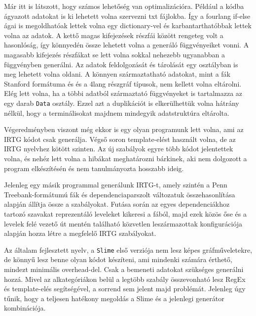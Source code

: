 Már itt is látszott, hogy számos lehetőség van optimalizációra. 
Például a kódba ágyazott adatokat is ki lehetett volna szervezni txt fájlokba. 
Így a fourlang if-else ágai is megoldhatóak lettek volna egy dictionary-vel és karbantarthatóbbak lettek volna az adatok. 
A kettő magas kifejezések részfái között rengeteg volt a hasonlóság, így könnyedén össze lehetett volna a generáló függvényeiket vonni. 
A magasabb kifejezés részfákat se lett volna sokkal nehezebb ugyanabban a függvényben generálni. 
Az adatok feldolgozását és tárolását egy osztályban is meg lehetett volna oldani. 
A könnyen származtatható adatokat, mint a fák Stanford formátuma és és a 4lang részgráf típusok, nem kellett volna eltárolni. 
Elég lett volna, ha a többi adatból származtató függvényeket is tartalmazza az egy darab \texttt{Data} osztály. 
Ezzel azt a duplikációt is elkerülhettük volna hátrány nélkül, hogy a terminálisokat majdnem mindegyik adatstruktúra eltárolta.

Végeredményben viszont még ekkor is egy olyan programunk lett volna, ami az IRTG kódot csak generálja. 
Végső soron template-elést használt volna, de az IRTG nyelvhez kötött szinten. 
Az új szabályok egyre több kódot jelentettek volna, és nehéz lett volna a hibákat meghatározni bárkinek, aki nem dolgozott a program elkészítésén és nem tanulmányozta hosszabb ideig.

Jelenleg egy másik programmal generálunk IRTG-t, amely szintén a Penn Treebank-formátumú fák és dependenciaparszolt változatuk összehasonlítása alapján állítja össze a szabályokat. 
Futása során az egyes dependenciákhoz tartozó szavakat reprezentáló leveleket kikeresi a fából, majd ezek közös őse és a levelek felé vezető út mentén található közvetlen leszármazottak konfigurációja alapján hozza létre a megfelelő IRTG szabályokat.

Az általam fejlesztett nyelv, a \texttt{Slime} első verziója nem lesz képes gráfműveletekre, de könnyű lesz benne olyan kódot készíteni, ami mindenki számára érthető, mindezt minimális overhead-del.
Csak a bemeneti adatokat szükséges generálni hozzá. 
Mivel az alkategóriákon belül a legtöbb szabály összevonható lesz RegEx és template-elés segítségével, a sorrend sem jelent majd problémát.
Jelenleg úgy tűnik, hogy a teljesen hatékony megoldás a Slime és a jelenlegi generátor kombinációja.
